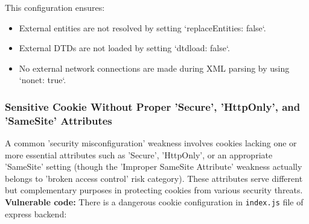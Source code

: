 \documentclass[]{article}
\begin{document}
This configuration ensures:
\begin{itemize}
    \item External entities are not resolved by setting `replaceEntities: false`.
    \item External DTDs are not loaded by setting `dtdload: false`.
    \item No external network connections are made during XML parsing by using `nonet: true`.
\end{itemize}

\subsubsection{Sensitive Cookie Without Proper 'Secure', 'HttpOnly', and 'SameSite' Attributes}
\label{subsubsec:sensitive_cookie_without_secure_and_httponly_attributes}

A common 'security misconfiguration' weakness involves cookies lacking one or more essential attributes such as 'Secure', 'HttpOnly', or an appropriate 'SameSite' setting (though the 'Improper SameSite Attribute' weakness actually belongs to 'broken access control' risk category). These attributes serve different but complementary purposes in protecting cookies from various security threats. \\ 
\textbf{Vulnerable code:}
There is a dangerous cookie configuration in \texttt{index.js} file of express backend:
\end{document}
